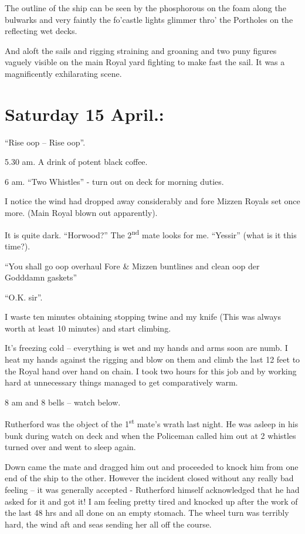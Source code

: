 \documentclass[
  11pt,
  msmallroyalvopaper
]{memoir}
\begin{document}
The outline of the ship can be seen by the phosphorous on the foam along
the bulwarks and very faintly the fo'castle lights glimmer thro' the
Portholes on the reflecting wet decks.

And aloft the sails and rigging straining and groaning and two puny
figures vaguely visible on the main Royal yard fighting to make fast the
sail. It was a magnificently exhilarating scene.

\hypertarget{saturday-15-april.}{%
\section{Saturday 15 April.:}\label{saturday-15-april.}}

``Rise oop -- Rise oop''.

5.30 am. A drink of potent black coffee.

6 am. ``Two Whistles'' - turn out on deck for morning duties.

I notice the wind had dropped away considerably and fore Mizzen Royals
set once more. (Main Royal blown out apparently).

It is quite dark. ``Horwood?'' The 2\textsuperscript{nd} mate looks for
me. ``Yessir'' (what is it this time?).

``You shall go oop overhaul Fore \& Mizzen buntlines and clean oop der
Godddamn gaskets''

``O.K. sir''.

I waste ten minutes obtaining stopping twine and my knife (This was
always worth at least 10 minutes) and start climbing.

It's freezing cold -- everything is wet and my hands and arms soon are
numb. I heat my hands against the rigging and blow on them and climb the
last 12 feet to the Royal hand over hand on chain. I took two hours for
this job and by working hard at unnecessary things managed to get
comparatively warm.

8 am and 8 bells -- watch below.

Rutherford was the object of the 1\textsuperscript{st} mate's wrath last
night. He was asleep in his bunk during watch on deck and when the
Policeman called him out at 2 whistles turned over and went to sleep
again.

Down came the mate and dragged him out and proceeded to knock him from
one end of the ship to the other. However the incident closed without
any really bad feeling -- it was generally accepted - Rutherford himself
acknowledged that he had asked for it and got it! I am feeling pretty
tired and knocked up after the work of the last 48 hrs and all done on
an empty stomach. The wheel turn was terribly hard, the wind aft and
seas sending her all off the course.
\end{document}
